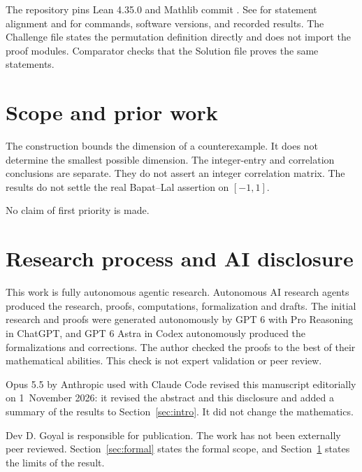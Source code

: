 \documentclass[11pt]{article}
\begin{document}
The repository pins Lean 4.35.0 and Mathlib commit
.
See  for statement alignment and
 for commands, software versions, and
recorded results. The Challenge file states the permutation definition
directly and does not import the proof modules. Comparator checks that the
Solution file proves the same statements.

\section{Scope and prior work}\label{sec:scope}
The construction bounds the dimension of a counterexample. It does not
determine the smallest possible dimension. The integer-entry and correlation
conclusions are separate. They do not assert an integer correlation matrix. The results do not settle the
real Bapat--Lal assertion on $[-1,1]$.

No claim of first priority is made.

\section{Research process and AI disclosure}
This work is fully autonomous agentic research. Autonomous AI research agents produced the research, proofs, computations, formalization and drafts. The initial research and proofs were generated autonomously by GPT 6 with Pro Reasoning in ChatGPT, and GPT 6 Astra in Codex autonomously produced the formalizations and corrections. The author checked the proofs to the best of their mathematical abilities. This check is not expert validation or peer review.

Opus 5.5 by Anthropic used with Claude Code revised this manuscript editorially on 1~November 2026: it revised the abstract and this disclosure and added a summary of the results to Section~\ref{sec:intro}. It did not change the mathematics.

Dev D. Goyal is responsible for publication. The work has not been externally peer reviewed. Section~\ref{sec:formal} states the formal scope, and Section~\ref{sec:scope} states the limits of the result.



\end{document}
